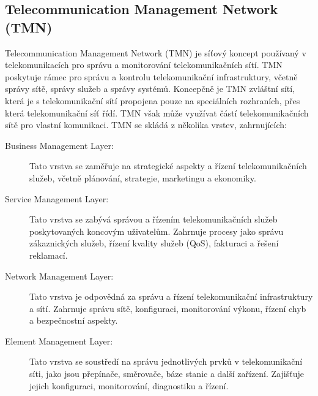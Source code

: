 \subsection{Telecommunication Management Network (TMN)}
Telecommunication Management Network (TMN) je síťový koncept používaný v telekomunikacích pro správu a monitorování telekomunikačních sítí. TMN poskytuje rámec pro správu a kontrolu telekomunikační infrastruktury, včetně správy sítě, správy služeb a správy systémů. Koncepčně je TMN zvláštní sítí, která je s telekomunikační sítí propojena pouze na speciálních rozhraních, přes která telekomunikační síť řídí. TMN však může využívat částí telekomunikačních sítě pro vlastní komunikaci.
TMN se skládá z několika vrstev, zahrnujících:
\begin{description}
    \item[Business Management Layer:] Tato vrstva se zaměřuje na strategické aspekty a řízení telekomunikačních služeb, včetně plánování, strategie, marketingu a ekonomiky.
    \item[Service Management Layer:] Tato vrstva se zabývá správou a řízením telekomunikačních služeb poskytovaných koncovým uživatelům. Zahrnuje procesy jako správu zákaznických služeb, řízení kvality služeb (QoS), fakturaci a řešení reklamací.
    \item[Network Management Layer:] Tato vrstva je odpovědná za správu a řízení telekomunikační infrastruktury a sítí. Zahrnuje správu sítě, konfiguraci, monitorování výkonu, řízení chyb a bezpečnostní aspekty.
    \item[Element Management Layer:] Tato vrstva se soustředí na správu jednotlivých prvků v telekomunikační síti, jako jsou přepínače, směrovače, báze stanic a další zařízení. Zajišťuje jejich konfiguraci, monitorování, diagnostiku a řízení.
\end{description}

